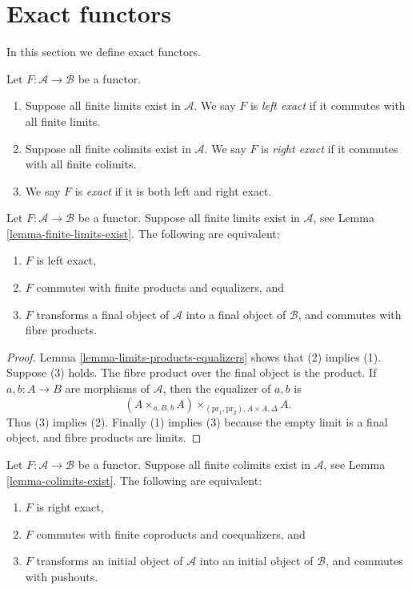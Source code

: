 \section{Exact functors}
\label{section-exact-functor}

\noindent
In this section we define exact functors.

\begin{definition}
\label{definition-exact}
Let $F : \mathcal{A} \to \mathcal{B}$ be a functor.
\begin{enumerate}
\item Suppose all finite limits exist in $\mathcal{A}$.
We say $F$ is {\it left exact} if it commutes
with all finite limits.
\item Suppose all finite colimits exist in $\mathcal{A}$.
We say $F$ is {\it right exact} if it commutes
with all finite colimits.
\item We say $F$ is {\it exact} if it is both left and right
exact.
\end{enumerate}
\end{definition}

\begin{lemma}
\label{lemma-characterize-left-exact}
Let $F : \mathcal{A} \to \mathcal{B}$ be a functor.
Suppose all finite limits exist in $\mathcal{A}$,
see Lemma \ref{lemma-finite-limits-exist}.
The following are equivalent:
\begin{enumerate}
\item $F$ is left exact,
\item $F$ commutes with finite products and equalizers, and
\item $F$ transforms a final object of $\mathcal{A}$
into a final object of $\mathcal{B}$, and commutes with fibre products.
\end{enumerate}
\end{lemma}

\begin{proof}
Lemma \ref{lemma-limits-products-equalizers} shows that (2) implies (1).
Suppose (3) holds. The fibre product over the final object is the product.
If $a, b : A \to B$ are morphisms of $\mathcal{A}$, then the
equalizer of $a, b$ is
$$
(A \times_{a, B, b} A)\times_{(\text{pr}_1, \text{pr}_2), A \times A, \Delta} A.
$$
Thus (3) implies (2). Finally (1) implies (3) because
the empty limit is a final object, and fibre products are limits.
\end{proof}

\begin{lemma}
\label{lemma-characterize-right-exact}
Let $F : \mathcal{A} \to \mathcal{B}$ be a functor.
Suppose all finite colimits exist in $\mathcal{A}$,
see Lemma \ref{lemma-colimits-exist}.
The following are equivalent:
\begin{enumerate}
\item $F$ is right exact,
\item $F$ commutes with finite coproducts and coequalizers, and
\item $F$ transforms an initial object of $\mathcal{A}$
into an initial object of $\mathcal{B}$, and commutes with pushouts.
\end{enumerate}
\end{lemma}

